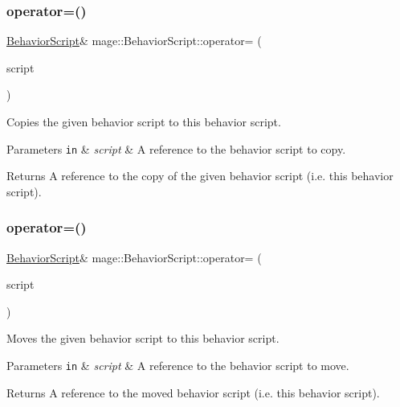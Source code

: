 \subsubsection{\texorpdfstring{operator=()}{operator=()}\hspace{0.1cm}{\footnotesize\ttfamily [1/2]}}
{\footnotesize\ttfamily \hyperlink{classmage_1_1_behavior_script}{Behavior\+Script}\& mage\+::\+Behavior\+Script\+::operator= (\begin{DoxyParamCaption}\item[{const \hyperlink{classmage_1_1_behavior_script}{Behavior\+Script} \&}]{script }\end{DoxyParamCaption})\hspace{0.3cm}{\ttfamily [delete]}}

Copies the given behavior script to this behavior script.


\begin{DoxyParams}[1]{Parameters}
\mbox{\tt in}  & {\em script} & A reference to the behavior script to copy. \\
\hline
\end{DoxyParams}
\begin{DoxyReturn}{Returns}
A reference to the copy of the given behavior script (i.\+e. this behavior script). 
\end{DoxyReturn}
\hypertarget{classmage_1_1_behavior_script_a528c2bd218f2e6bb7d0a8ee50a05bf01}{}\label{classmage_1_1_behavior_script_a528c2bd218f2e6bb7d0a8ee50a05bf01} 
\subsubsection{\texorpdfstring{operator=()}{operator=()}\hspace{0.1cm}{\footnotesize\ttfamily [2/2]}}
{\footnotesize\ttfamily \hyperlink{classmage_1_1_behavior_script}{Behavior\+Script}\& mage\+::\+Behavior\+Script\+::operator= (\begin{DoxyParamCaption}\item[{\hyperlink{classmage_1_1_behavior_script}{Behavior\+Script} \&\&}]{script }\end{DoxyParamCaption})\hspace{0.3cm}{\ttfamily [delete]}}

Moves the given behavior script to this behavior script.


\begin{DoxyParams}[1]{Parameters}
\mbox{\tt in}  & {\em script} & A reference to the behavior script to move. \\
\hline
\end{DoxyParams}
\begin{DoxyReturn}{Returns}
A reference to the moved behavior script (i.\+e. this behavior script). 
\end{DoxyReturn}
\hypertarget{classmage_1_1_behavior_script_ab0dc76b101fd514c6e9f8799de382e8a}{}\label{classmage_1_1_behavior_script_ab0dc76b101fd514c6e9f8799de382e8a} 
